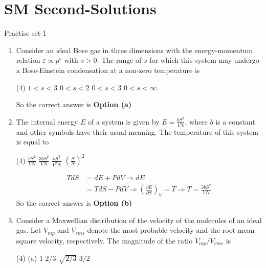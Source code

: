 \chapter{SM Second-Solutions}
\begin{abox}
	Practise set-1
\end{abox}
\begin{enumerate}
	\item Consider an ideal Bose gas in three dimensions with the energy-momentum relation $\varepsilon \propto p^{s}$ with $s>0$. The range of $s$ for which this system may undergo a Bose-Einstein condensation at a non-zero temperature is
	{}
	\begin{tasks}(4)
		\task[\textbf{a.}] $1<s<3$
		\task[\textbf{b.}] $0<s<2$
		\task[\textbf{c.}] $0<s<3$
		\task[\textbf{d.}] $0<s<\infty$
	\end{tasks}
\begin{answer}
	So the correct answer is \textbf{Option (a)}
\end{answer}
	\item The internal energy $E$ of a system is given by $E=\frac{b S^{3}}{V N}$, where $b$ is a constant and other symbols have their usual meaning. The temperature of this system is equal to
	{}
	\begin{tasks}(4)
		\task[\textbf{a.}] $\frac{b S^{2}}{V N}$
		\task[\textbf{b.}] $\frac{3 b S^{2}}{V N}$
		\task[\textbf{c.}]  $\frac{b S^{3}}{V^{2} N}$
		\task[\textbf{d.}] $\left(\frac{S}{N}\right)^{2}$
	\end{tasks}
\begin{answer}
	\begin{align*}
	T d S&=d E+P d V \Rightarrow d E\\&=T d S-P d V \Rightarrow\left(\frac{\partial E}{\partial S}\right)_{V}=T \Rightarrow T=\frac{3 b S^{2}}{V N}
	\end{align*}
	So the correct answer is \textbf{Option (b)}
\end{answer}
	\item Consider a Maxwellian distribution of the velocity of the molecules of an ideal gas. Let $V_{m p}$ and $V_{r m s}$ denote the most probable velocity and the root mean square velocity, respectively. The magnitude of the ratio $V_{m p} / V_{r m s}$ is
	{}
	\begin{tasks}(4)
		\task[\textbf{a.}] (a) 1
		\task[\textbf{b.}] $2 / 3$
		\task[\textbf{c.}] $\sqrt{2 / 3}$
		\task[\textbf{d.}] $3 / 2$
	\end{tasks}

\end{enumerate}
